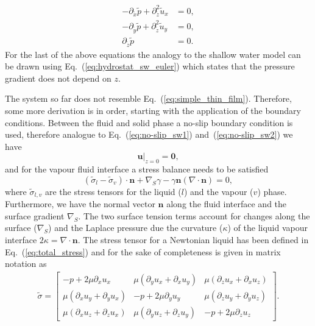 \begin{align}
    -\partial_{\tilde{x}}\tilde{p} + \partial^2_{\tilde{z}}\tilde{u}_x &= 0,  \label{eq:thin_film_pressure_x}\\
    -\partial_{\tilde{y}}\tilde{p} + \partial^2_{\tilde{z}}\tilde{u}_y &= 0,  \label{eq:thin_film_pressure_y}\\
    \partial_{\tilde{z}}\tilde{p} &= 0. \label{eq:thin_film_pressure_z}
\end{align}
For the last of the above equations the analogy to the shallow water model can be drawn using Eq.~(\ref{eq:hydrostat_sw_euler}) which states that the pressure gradient does not depend on $z$.
 
The system so far does not resemble Eq.~(\ref{eq:simple_thin_film}).
Therefore, some more derivation is in order, starting with the application of the boundary conditions.
Between the fluid and solid phase a no-slip boundary condition is used, therefore analogue to Eq.~(\ref{eq:no-slip_sw1}) and~(\ref{eq:no-slip_sw2}) we have
\begin{equation}\label{eq:thin_all_v_noslip}
    \mathbf{u}|_{z=0} = \mathbf{0},    
\end{equation}
and for the vapour fluid interface a stress balance needs to be satisfied~\cite{lealAdvancedTransportPhenomena2007}
\begin{equation}\label{eq:thin_film_upper_bc}
    (\tilde{\sigma}_l - \tilde{\sigma}_v)\cdot\mathbf{n} + \nabla_S\gamma - \gamma\mathbf{n}(\nabla\cdot\mathbf{n}) = 0,
\end{equation}
where $\tilde{\sigma}_{l,v}$ are the stress tensors for the liquid ($l$) and the vapour ($v$) phase. 
Furthermore, we have the normal vector $\mathbf{n}$ along the fluid interface and the surface gradient $\nabla_S$.
The two surface tension terms account for changes along the surface ($\nabla_S$) and the Laplace pressure due the curvature ($\kappa$) of the liquid vapour interface $2\kappa = \nabla\cdot\mathbf{n}$.
The stress tensor for a Newtonian liquid has been defined in Eq.~(\ref{eq:total_stress}) and for the sake of completeness is given in matrix notation as 
\begin{gather}\label{eq:stress_matrix}
    \tilde{\sigma} = \begin{bmatrix}
    -p + 2\mu\partial_x u_x & \mu(\partial_y u_x + \partial_x u_y) & \mu(\partial_z u_x + \partial_x u_z) \\
    \mu(\partial_x u_y + \partial_y u_x) & -p + 2\mu\partial_y u_y & \mu(\partial_z u_y + \partial_y u_z) \\
    \mu(\partial_x u_z + \partial_z u_x) & \mu(\partial_y u_z + \partial_z u_y) & -p + 2\mu\partial_z u_z   
    \end{bmatrix} .
\end{gather}
